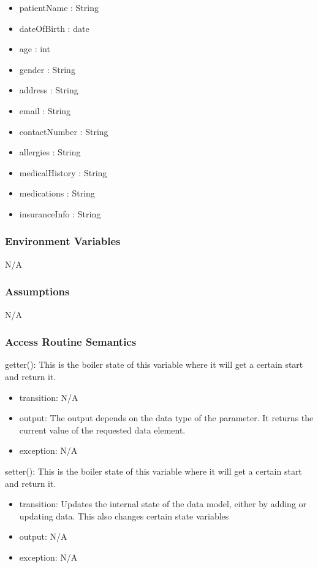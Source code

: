 \documentclass[12pt, titlepage]{article}
\begin{document}
\begin{itemize}
    \item patientName : String
    \item dateOfBirth : date
    \item age : int
    \item gender : String
    \item address : String
    \item email : String
    \item contactNumber : String
    \item allergies : String
    \item medicalHistory : String
    \item medications : String
    \item insuranceInfo : String
\end{itemize}

\subsubsection{Environment Variables}

N/A

\subsubsection{Assumptions}

N/A

\subsubsection{Access Routine Semantics}

\noindent getter(): This is the boiler state of this variable where it will get a certain start and return it.
\begin{itemize}
    \item transition: N/A
    \item output: The output depends on the data type of the parameter. It returns the current value of the requested data element.
    \item exception: N/A
\end{itemize}

\noindent setter(): This is the boiler state of this variable where it will get a certain start and return it.
\begin{itemize}
    \item transition: Updates the internal state of the data model, either by adding or updating data. This also changes certain state variables
    \item output: N/A
    \item exception: N/A
\end{itemize}
\end{document}
